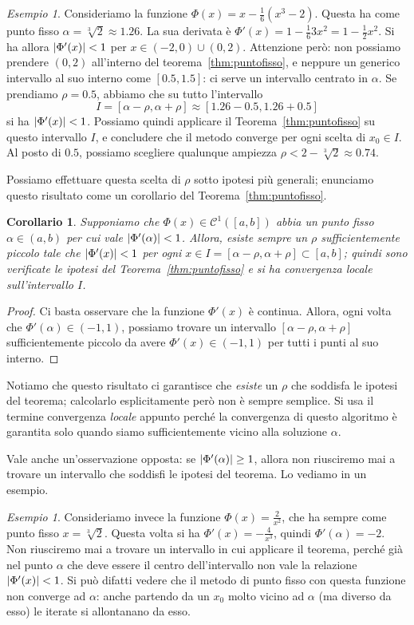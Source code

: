 \documentclass[a4paper]{report}
\DeclarePairedDelimiter{\abs}{\lvert}{\rvert}
\newtheorem{corollary}[theorem]{Corollario}
\theoremstyle{definition}
\theoremstyle{remark}
\newtheorem{esempio}[theorem]{Esempio}
\begin{document}
\begin{esempio}
Consideriamo la funzione $\Phi(x) = x - \frac16 (x^3-2)$. Questa ha come punto fisso $\alpha =\sqrt[3]{2} \approx 1.26$. La sua derivata è $\Phi'(x) = 1 - \frac{1}{6}3x^2 = 1 - \frac{1}{2}x^2$. Si ha allora $\abs{\Phi'(x)}<1$ per $x \in (-2,0) \cup (0,2)$. Attenzione però: non possiamo prendere $(0,2)$ all'interno del teorema~\ref{thm:puntofisso}, e neppure un generico intervallo al suo interno come $[0.5,1.5]$: ci serve un intervallo centrato in $\alpha$. Se prendiamo $\rho = 0.5$, abbiamo che su tutto l'intervallo
\[
    I = [\alpha-\rho,\alpha+\rho] \approx [1.26-0.5,1.26+0.5]
\]
si ha $\abs{\Phi'(x)}<1$. Possiamo quindi applicare il Teorema~\ref{thm:puntofisso} su questo intervallo $I$, e concludere che il metodo converge per ogni scelta di $x_0 \in I$. Al posto di $0.5$, possiamo scegliere qualunque ampiezza $\rho < 2 - \sqrt[3]{2} \approx 0.74$.
\end{esempio}
Possiamo effettuare questa scelta di $\rho$ sotto ipotesi più generali; enunciamo questo risultato come un corollario del Teorema~\ref{thm:puntofisso}. 
\begin{corollary} \label{oss:corpuntofisso}
    Supponiamo che $\Phi(x) \in \mathcal{C}^1([a,b])$ abbia un punto fisso $\alpha\in (a,b)$ per cui vale $\abs{\Phi'(\alpha)} < 1$. Allora, esiste sempre un $\rho$ sufficientemente piccolo tale che $\abs{\Phi'(x)} < 1$ per ogni $x \in I = [\alpha - \rho, \alpha + \rho] \subset [a,b]$; quindi sono verificate le ipotesi del Teorema~\ref{thm:puntofisso} e si ha convergenza locale sull'intervallo $I$.
\end{corollary}
\begin{proof}
    Ci basta osservare che la funzione $\Phi'(x)$ è continua. Allora, ogni volta che $\Phi'(\alpha) \in (-1,1)$, possiamo trovare un intervallo $[\alpha-\rho,\alpha+\rho]$ sufficientemente piccolo da avere $\Phi'(x) \in (-1,1)$ per tutti i punti al suo interno.
\end{proof}
Notiamo che questo risultato ci garantisce che \emph{esiste} un $\rho$ che soddisfa le ipotesi del teorema; calcolarlo esplicitamente però non è sempre semplice. Si usa il termine convergenza \emph{locale} appunto perché la convergenza di questo algoritmo è garantita solo quando siamo sufficientemente vicino alla soluzione $\alpha$.

Vale anche un'osservazione opposta: se $\abs{\Phi'(\alpha)} \geq 1$, allora non riusciremo mai a trovare un intervallo che soddisfi le ipotesi del teorema. Lo vediamo in un esempio.
\begin{esempio}
Consideriamo invece la funzione $\Phi(x) = \frac{2}{x^2}$, che ha sempre come punto fisso $x=\sqrt[3]{2}$. Questa volta si ha $\Phi'(x) = -\frac{4}{x^3}$, quindi $\Phi'(\alpha) = -2$. Non riusciremo mai a trovare un intervallo in cui applicare il teorema, perché già nel punto $\alpha$ che deve essere il centro dell'intervallo non vale la relazione $\abs{\Phi'(x)}< 1$. Si può difatti vedere che il metodo di punto fisso con questa funzione non converge ad $\alpha$: anche partendo da un $x_0$ molto vicino ad $\alpha$ (ma diverso da esso) le iterate si allontanano da esso.
\end{esempio}
    
\end{document}
